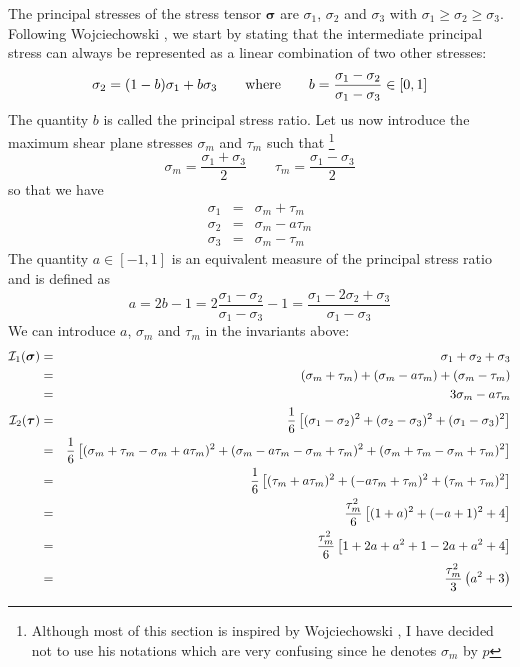 The principal stresses of the stress tensor ${\bm \sigma}$ are $\sigma_1$, $\sigma_2$
and $\sigma_3$ with $\sigma_1 \geq \sigma_2 \geq \sigma_3$.
Following Wojciechowski \cite{wojc18}, we start by stating that the intermediate principal 
stress can always be represented as a linear combination of two other stresses:
\begin{equation}
\sigma_2 = (1-b)\sigma_1 + b \sigma_3
\qquad
{\rm where}
\qquad
b = \frac{\sigma_1-\sigma_2}{\sigma_1-\sigma_3}\in [0,1]
\end{equation}
The quantity $b$ is called the principal stress ratio. 
Let us now introduce the maximum shear plane stresses $\sigma_m$ and $\tau_m$ such that
\footnote{Although most of this section is inspired by Wojciechowski \cite{wojc18}, 
I have decided not to use his notations which are very confusing since he denotes $\sigma_m$ by $p$} 
\begin{equation}
\boxed{\sigma_m=\frac{\sigma_1+\sigma_3}{2}}
\qquad
\boxed{\tau_m=\frac{\sigma_1-\sigma_3}{2}}
\end{equation}
so that we have 
\begin{eqnarray}
\sigma_1 &=& \sigma_m+\tau_m \\
\sigma_2 &=& \sigma_m-a\tau_m \\ 
\sigma_3 &=& \sigma_m-\tau_m
\end{eqnarray}
The quantity $a\in[-1,1]$ is an equivalent measure of the principal stress ratio and 
is defined as 
\begin{equation}
a=2b-1 =2 \frac{\sigma_1-\sigma_2}{\sigma_1-\sigma_3}-1=\frac{\sigma_1-2\sigma_2+\sigma_3}{\sigma_1-\sigma_3}
\end{equation}
We can introduce $a$, $\sigma_m$ and $\tau_m$ in the invariants above:
\begin{eqnarray}
{\cal I}_1({\bm \sigma}) 
&=& \sigma_1 + \sigma_2 + \sigma_3 \nonumber\\
&=& (\sigma_m+\tau_m) + (\sigma_m-a\tau_m) + (\sigma_m-\tau_m) \nonumber\\
&=& 3\sigma_m -a\tau_m \\
{\cal I}_2({\bm \tau}) 
&=&\frac{1}{6}\left[(\sigma_{1}-\sigma_{2})^2 +(\sigma_{2}-\sigma_{3})^2 +(\sigma_{1}-\sigma_{3})^2\right]\nonumber\\ 
&=&\frac{1}{6}\left[(\sigma_m+\tau_m-\sigma_m+a\tau_m)^2 +(\sigma_m-a\tau_m-\sigma_m+\tau_m)^2 
+(\sigma_m+\tau_m-\sigma_m+\tau_m)^2\right]\nonumber\\ 
&=&\frac{1}{6}\left[(\tau_m+a\tau_m)^2 +(-a\tau_m+\tau_m)^2 +(\tau_m+\tau_m)^2\right]\nonumber\\ 
&=&\frac{\tau_m^2}{6}\left[(1+a)^2 +(-a+1)^2 + 4 \right]\nonumber\\ 
&=&\frac{\tau_m^2}{6}\left[ 1+2a+a^2 +1 - 2a+a^2 + 4 \right]\nonumber\\ 
&=&\frac{\tau_m^2}{3}\left( a^2 +3 \right)
\end{eqnarray}
